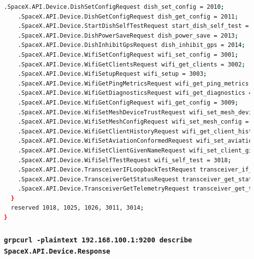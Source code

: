 \documentclass[IN,11pt,twoside,openright,bachelor,english]{tumthesis}
\begin{document}
\begin{lstlisting}[language=bash,basicstyle=\tiny]
    .SpaceX.API.Device.DishSetConfigRequest dish_set_config = 2010;
    .SpaceX.API.Device.DishGetConfigRequest dish_get_config = 2011;
    .SpaceX.API.Device.StartDishSelfTestRequest start_dish_self_test = 2012;
    .SpaceX.API.Device.DishPowerSaveRequest dish_power_save = 2013;
    .SpaceX.API.Device.DishInhibitGpsRequest dish_inhibit_gps = 2014;
    .SpaceX.API.Device.WifiSetConfigRequest wifi_set_config = 3001;
    .SpaceX.API.Device.WifiGetClientsRequest wifi_get_clients = 3002;
    .SpaceX.API.Device.WifiSetupRequest wifi_setup = 3003;
    .SpaceX.API.Device.WifiGetPingMetricsRequest wifi_get_ping_metrics = 3007;
    .SpaceX.API.Device.WifiGetDiagnosticsRequest wifi_get_diagnostics = 3008;
    .SpaceX.API.Device.WifiGetConfigRequest wifi_get_config = 3009;
    .SpaceX.API.Device.WifiSetMeshDeviceTrustRequest wifi_set_mesh_device_trust = 3012;
    .SpaceX.API.Device.WifiSetMeshConfigRequest wifi_set_mesh_config = 3013 [deprecated = true];
    .SpaceX.API.Device.WifiGetClientHistoryRequest wifi_get_client_history = 3015;
    .SpaceX.API.Device.WifiSetAviationConformedRequest wifi_set_aviation_conformed = 3016;
    .SpaceX.API.Device.WifiSetClientGivenNameRequest wifi_set_client_given_name = 3017;
    .SpaceX.API.Device.WifiSelfTestRequest wifi_self_test = 3018;
    .SpaceX.API.Device.TransceiverIFLoopbackTestRequest transceiver_if_loopback_test = 4001;
    .SpaceX.API.Device.TransceiverGetStatusRequest transceiver_get_status = 4003;
    .SpaceX.API.Device.TransceiverGetTelemetryRequest transceiver_get_telemetry = 4004;
  }
  reserved 1018, 1025, 1026, 3011, 3014;
}
\end{lstlisting}

\subsubsection{\texttt{grpcurl -plaintext 192.168.100.1:9200 describe SpaceX.API.Device.Response}}
\end{document}
